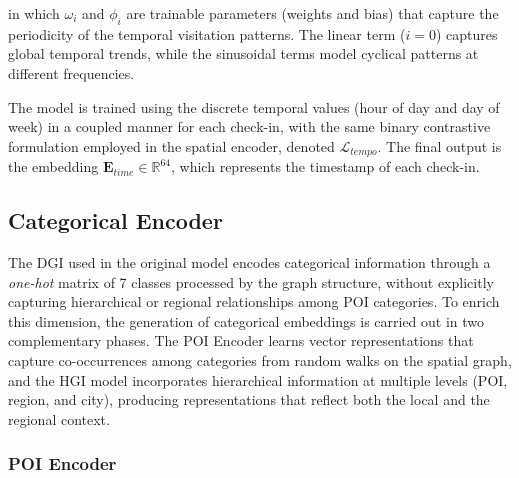 in which $\omega_i$ and $\phi_i$ are trainable parameters (weights and bias) that capture the periodicity of the temporal visitation patterns. The linear term ($i=0$) captures global temporal trends, while the sinusoidal terms model cyclical patterns at different frequencies.

The model is trained using the discrete temporal values (hour of day and day of week) in a coupled manner for each check-in, with the same binary contrastive formulation employed in the spatial encoder, denoted $\mathcal{L}_{tempo}$. The final output is the embedding $\mathbf{E}_{time} \in \mathbb{R}^{64}$, which represents the timestamp of each check-in.

\subsection{Categorical Encoder}

The DGI used in the original model encodes categorical information through a \textit{one-hot} matrix of 7 classes processed by the graph structure, without explicitly capturing hierarchical or regional relationships among POI categories. To enrich this dimension, the generation of categorical embeddings is carried out in two complementary phases. The POI Encoder learns vector representations that capture co-occurrences among categories from random walks on the spatial graph, and the HGI model \cite{huang2023hgi} incorporates hierarchical information at multiple levels (POI, region, and city), producing representations that reflect both the local and the regional context.

\subsubsection{POI Encoder}

